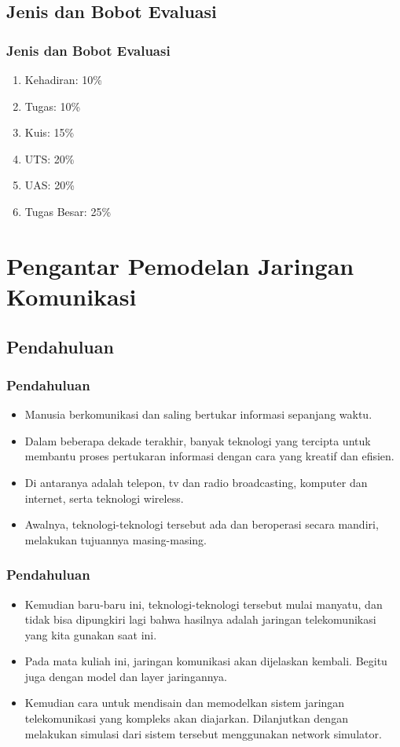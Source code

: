 \documentclass[pdflatex,compress]{beamer}
\begin{document}
\subsection{Jenis dan Bobot Evaluasi}
\begin{frame}
	\frametitle{Jenis dan Bobot Evaluasi}
	\begin{enumerate}
		\item Kehadiran: 10\%
		\item Tugas: 10\%
		\item Kuis: 15\%
		\item UTS: 20\%
		\item UAS: 20\%
		\item Tugas Besar: 25\%
	\end{enumerate}
\end{frame}

\section{Pengantar Pemodelan Jaringan Komunikasi}
\subsection{Pendahuluan}
\begin{frame}
	\frametitle{Pendahuluan}
	\begin{itemize}
		\item Manusia berkomunikasi dan saling bertukar informasi sepanjang waktu.
		\item Dalam beberapa dekade terakhir, banyak teknologi yang tercipta untuk membantu proses pertukaran informasi dengan cara yang kreatif dan efisien.
		\item Di antaranya adalah telepon, tv dan radio broadcasting, komputer dan internet, serta teknologi wireless.
		\item Awalnya, teknologi-teknologi tersebut ada dan beroperasi secara mandiri, melakukan tujuannya masing-masing.
	\end{itemize}
\end{frame}

\begin{frame}
	\frametitle{Pendahuluan}
	\begin{itemize}
		\item Kemudian baru-baru ini, teknologi-teknologi tersebut mulai manyatu, dan tidak bisa dipungkiri lagi bahwa hasilnya adalah jaringan telekomunikasi yang kita gunakan saat ini.
		\item Pada mata kuliah ini, jaringan komunikasi akan dijelaskan kembali. Begitu juga dengan model dan layer jaringannya.
		\item Kemudian cara untuk mendisain dan memodelkan sistem jaringan telekomunikasi yang kompleks akan diajarkan. Dilanjutkan dengan melakukan simulasi dari sistem tersebut menggunakan network simulator.
	\end{itemize}
\end{frame}
\end{document}
